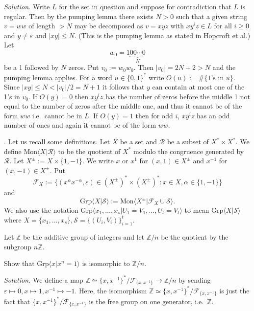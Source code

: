 \documentclass[10pt,a4paper,reqno]{amsart}
\begin{document}
\emph{Solution.} Write $L$ for the set in question and suppose for
contradiction that $L$ is regular. Then by the pumping lemma there exists $N >
0$ such that a given string $v = ww$ of length $> N$ may be decomposed as $v =
xyz$ with $xy^iz \in L$ for all $i \ge 0$ and $y \neq \varepsilon$ and $|xy|
\le N$. (This is the pumping lemma as stated in Hopcroft et al.) Let $$w_0 =
1\underbrace{00\cdots0}_{N}$$ be a 1 followed by $N$ zeros. Put $v_0 :=
w_0w_0$. Then $|v_0| = 2N+2 > N$ and the pumping lemma applies. For a word
$u\in \{0,1\}^*$ write $O(u) := \#\{\text{1's in } u\}$. Since $|xy| \le N <
|v_0|/2 = N+1$ it follows that $y$ can contain at most one of the 1's in $v_0$.
If $O(y) = 0$ then $xy^iz$ has the number of zeros before the middle 1 not
equal to the number of zeros after the middle one, and thus it cannot be of the
form $ww$ i.e.~cannot be in $L$. If $O(y)=1$ then for odd $i$, $xy^iz$ has an
odd number of ones and again it cannot be of the form $ww$.

\bigskip

\newcommand{\Mon}[1]{\ensuremath{\mathrm{Mon}\langle #1\rangle}}
\newcommand{\Grp}[1]{\ensuremath{\mathrm{Grp}\langle #1\rangle}}

. Let us recall some definitions. Let $X$ be a set and $\mathcal{R}$
be a subset of $X^*\times X^*$. We define \Mon{X|\mathcal{R}} to be the
quotient of $X^*$ modulo the congruence generated by $\mathcal{R}$. Let
$X^{\pm} := X\times \{1,-1\}$. We write $x$ or $x^1$ for $(x,1) \in X^\pm$ and
$x^{-1}$ for $(x,-1) \in X^\pm$. Put \[\mathcal{F}_X := \{(x^\alpha
x^{-\alpha}, \varepsilon) \in (X^\pm)^*\times (X^\pm)^* : x \in X, \alpha\in
\{1,-1\}\}\] and \[\Grp{X | \mathcal{S}} := \Mon{X^\pm | \mathcal{F}_X \cup
\mathcal{S}}.\] We also use the notation \(\Grp{x_1,\dots,x_s|U_1 = V_1, \dots,
U_t = V_t}\) to mean \Grp{X|\mathcal{S}} where $X = \{x_1,\dots,x_s\},
\mathcal{S} = \{(U_i,V_i)\}_{i=1}^t.$

Let $\mathbb{Z}$ be the additive group of integers and let $\mathbb{Z}/n$ be
the quotient by the subgroup $n\mathbb{Z}$.

Show that \Grp{x | x^n=1} is isomorphic to $\mathbb{Z}/n$.

\bigskip

\emph{Solution.} We define a map \(\mathbb{Z}\simeq
\{x,x^{-1}\}^*/\mathcal{F}_{\{x,x^{-1}\}}\rightarrow \mathbb{Z}/n\) by sending
$\varepsilon \mapsto 0, x\mapsto 1, x^{-1} \mapsto -1$. Here, the isomorphism
$\mathbb{Z}\simeq \{x,x^{-1}\}^*/\mathcal{F}_{\{x,x^{-1}\}}$ is just the fact
that $\{x,x^{-1}\}^*/\mathcal{F}_{\{x,x^{-1}\}}$ is the free group on one
generator, i.e.~$\mathbb{Z}$.
\end{document}
